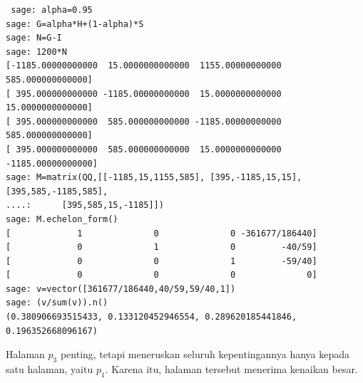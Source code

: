 \begin{exercises}
\begin{answer}
\begin{exparts}
\begin{lstlisting}
 sage: alpha=0.95
sage: G=alpha*H+(1-alpha)*S
sage: N=G-I
sage: 1200*N
[-1185.00000000000  15.0000000000000  1155.00000000000  585.000000000000]
[ 395.000000000000 -1185.00000000000  15.0000000000000  15.0000000000000]
[ 395.000000000000  585.000000000000 -1185.00000000000  585.000000000000]
[ 395.000000000000  585.000000000000  15.0000000000000 -1185.00000000000]
sage: M=matrix(QQ,[[-1185,15,1155,585], [395,-1185,15,15], [395,585,-1185,585],
....:      [395,585,15,-1185]])
sage: M.echelon_form()
[             1              0              0 -361677/186440]
[             0              1              0         -40/59]
[             0              0              1         -59/40]
[             0              0              0              0]
sage: v=vector([361677/186440,40/59,59/40,1])
sage: (v/sum(v)).n()
(0.380906693515433, 0.133120452946554, 0.289620185441846, 0.196352668096167)
\end{lstlisting}
       \item Halaman $p_3$ penting, tetapi meneruskan seluruh kepentingannya
         hanya kepada satu halaman, yaitu $p_1$. Karena itu, halaman tersebut
         menerima kenaikan besar.
      \end{exparts}    
    \end{answer}
\end{exercises}
\endinput

